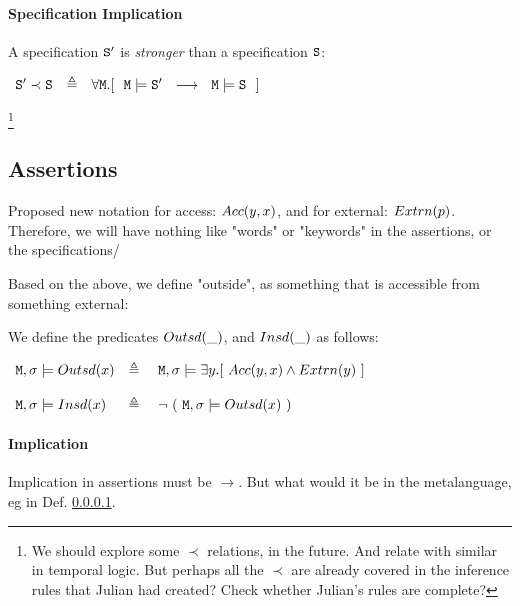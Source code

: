 \paragraph{Specification Implication}
\label{lab:def:imply}

\begin{definition}
A specification ${\texttt{S}}{'}$ is \emph{stronger} than a specification ${\texttt{S}}{}$:

$\begin{array}{lll}
 \SpecB{'}\prec \SpecB{} & \triangleq &  
 \forall  \Mod . [\ \  \Mod \models \SpecB{'} \ \ \longrightarrow\ \   \Mod  \models \SpecB{}\ \ ]
  \end{array}
$

\end{definition}\footnote{ We should explore some $\prec$ relations, in the future. And relate with similar in temporal logic. But perhaps all the $\prec$ are already covered in the inference rules that Julian had created? Check whether Julian's rules are complete?}


\subsection{Assertions}

Proposed new notation for access: $Acc(y,x)$, and for external: $Extrn(p)$. Therefore, we will have nothing like "words" or "keywords" in the assertions, or the specifications/

Based on the above, we define "outside", as something that is accessible from something external:

\begin{definition}

We define the predicates $Outsd(\_)$, and $Insd(\_)$ as follows:

$\begin{array}{lll}
   \Mod, \sigma \models \outside{x} & \triangleq & \ \Mod, \sigma \models \exists y.[ \ \access{y} {x} \wedge \external {y}  \ ] 
  ~ \\
   \\
      \Mod, \sigma \models \inside{x} & \triangleq & \ \neg \ (\  \Mod, \sigma \models \outside{x}  \ )
  \end{array}
$

\end{definition}



\paragraph{Implication}

Implication in assertions must be $\longrightarrow$. But what would it be in the metalanguage, eg in Def. \ref{lab:def:imply}.